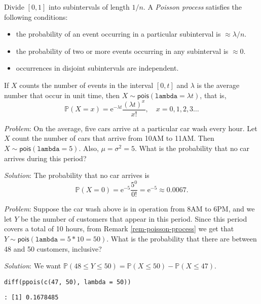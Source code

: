Divide \([0,1]\) into subintervals of length \(1/n\). A \emph{Poisson
process}  satisfies the following conditions:
\begin{itemize}
\item the probability of an event occurring in a particular subinterval is
\(\approx\lambda/n\).
\item the probability of two or more events occurring in any subinterval
is \(\approx 0\).
\item occurrences in disjoint subintervals are independent.
\end{itemize}

\begin{rem}
\label{rem-poisson-process} If \(X\) counts the number of events in the
interval \([0,t]\) and \(\lambda\) is the average number that occur in
unit time, then \(X\sim\mathsf{pois}(\mathtt{lambda}=\lambda t)\),
that is,
\begin{equation}
\mathbb{P}(X=x)=\mathrm{e}^{-\lambda t}\frac{(\lambda t)^{x}}{x!},\quad x=0,1,2,3\ldots
\end{equation}
\end{rem}

\emph{Problem}:
On the average, five cars arrive at a particular car wash every
hour. Let \(X\) count the number of cars that arrive from 10AM to
11AM. Then \(X\sim\mathsf{pois}(\mathtt{lambda}=5)\). Also,
\(\mu=\sigma^{2}=5\). What is the probability that no car arrives
during this period?

\emph{Solution}: The probability that no car arrives
is \[
\mathbb{P}(X=0)=\mathrm{e}^{-5}\frac{5^{0}}{0!}=\mathrm{e}^{-5}\approx0.0067.
\]



\emph{Problem}:
Suppose the car wash above is in operation from 8AM to 6PM, and we let
\(Y\) be the number of customers that appear in this period. Since
this period covers a total of 10 hours, from Remark \ref{rem-poisson-process} we
get that \(Y\sim\mathsf{pois}(\mathtt{lambda}=5\ast10=50)\). What is
the probability that there are between 48 and 50 customers, inclusive?

\emph{Solution}: We want \(\mathbb{P}(48\leq
Y\leq50)=\mathbb{P}(X\leq50)-\mathbb{P}(X\leq47)\).

\begin{Verbatim}
diff(ppois(c(47, 50), lambda = 50))
\end{Verbatim}

\begin{verbatim}
: [1] 0.1678485
\end{verbatim}

